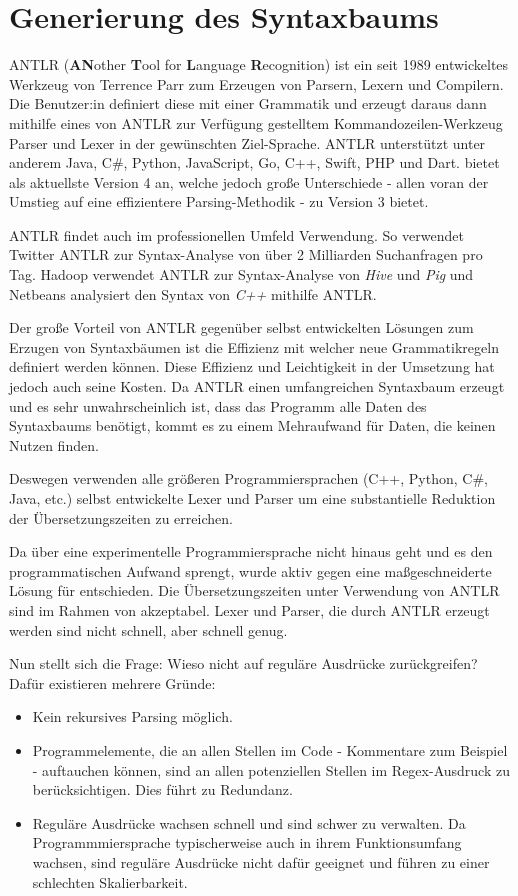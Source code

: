 \chapter{Generierung des Syntaxbaums}
\label{cha:antlr}

ANTLR (\textbf{AN}other \textbf{T}ool for \textbf{L}anguage \textbf{R}ecognition) ist ein seit 1989 entwickeltes Werkzeug von Terrence Parr zum Erzeugen von Parsern, Lexern und Compilern. Die Benutzer:in definiert diese mit einer Grammatik und erzeugt daraus dann mithilfe eines von ANTLR zur Verfügung gestelltem Kommandozeilen-Werkzeug Parser und Lexer in der gewünschten Ziel-Sprache. ANTLR unterstützt unter anderem Java, C\#, Python, JavaScript, Go, C++, Swift, PHP und Dart. \toya bietet als aktuellste Version 4 an, welche jedoch große Unterschiede - allen voran der Umstieg auf eine effizientere Parsing-Methodik - zu Version 3 bietet.

ANTLR findet auch im professionellen Umfeld Verwendung. So verwendet Twitter ANTLR zur Syntax-Analyse von über 2 Milliarden Suchanfragen pro Tag. Hadoop verwendet ANTLR zur Syntax-Analyse von \textit{Hive} und \textit{Pig} und Netbeans analysiert den Syntax von \textit{C++} mithilfe ANTLR. 

Der große Vorteil von ANTLR gegenüber selbst entwickelten Lösungen zum Erzugen von Syntaxbäumen ist die Effizienz mit welcher neue Grammatikregeln definiert werden können. Diese Effizienz und Leichtigkeit in der Umsetzung hat jedoch auch seine Kosten. Da ANTLR einen umfangreichen Syntaxbaum erzeugt und es sehr unwahrscheinlich ist, dass das Programm alle Daten des Syntaxbaums benötigt, kommt es zu einem Mehraufwand für Daten, die keinen Nutzen finden.

Deswegen verwenden alle größeren Programmiersprachen (C++, Python, C\#, Java, etc.) selbst entwickelte Lexer und Parser um eine substantielle Reduktion der Übersetzungszeiten zu erreichen.

Da \toya über eine experimentelle Programmiersprache nicht hinaus geht und es den programmatischen Aufwand sprengt, wurde aktiv gegen eine maßgeschneiderte Lösung für \toya entschieden. Die Übersetzungszeiten unter Verwendung von ANTLR sind im Rahmen von \toya akzeptabel. Lexer und Parser, die durch ANTLR erzeugt werden sind nicht schnell, aber schnell genug.

Nun stellt sich die Frage: Wieso nicht auf reguläre Ausdrücke zurückgreifen? Dafür existieren mehrere Gründe:
\begin{itemize}
    \item Kein rekursives Parsing möglich.
    \item Programmelemente, die an allen Stellen im Code - Kommentare zum Beispiel - auftauchen können, sind an allen potenziellen Stellen im Regex-Ausdruck zu berücksichtigen. Dies führt zu Redundanz.
    \item Reguläre Ausdrücke wachsen schnell und sind schwer zu verwalten. Da Programmmiersprache typischerweise auch in ihrem Funktionsumfang wachsen, sind reguläre Ausdrücke nicht dafür geeignet und führen zu einer schlechten Skalierbarkeit.
\end{itemize}

